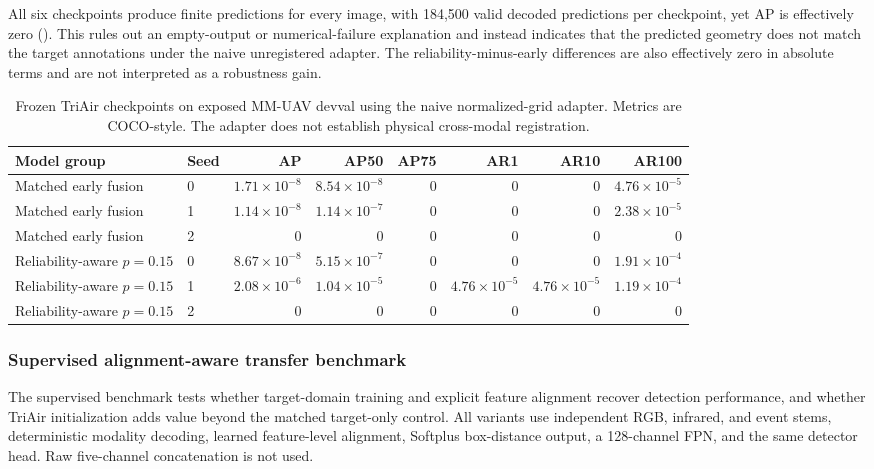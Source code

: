 All six checkpoints produce finite predictions for every image, with 184,500 valid decoded predictions per checkpoint, yet AP is effectively zero (). This rules out an empty-output or numerical-failure explanation and instead indicates that the predicted geometry does not match the target annotations under the naive unregistered adapter. The reliability-minus-early differences are also effectively zero in absolute terms and are not interpreted as a robustness gain.

\begin{table}[t]
\centering
\caption{Frozen TriAir checkpoints on exposed MM-UAV devval using the naive normalized-grid adapter. Metrics are COCO-style. The adapter does not establish physical cross-modal registration.}
\label{tab:mmuav-zero-shot}
\scriptsize
\begin{tabular}{@{}llrrrrrr@{}}
\toprule
Model group & Seed & AP & AP50 & AP75 & AR1 & AR10 & AR100\\
\midrule
Matched early fusion & 0 & $1.71{\times}10^{-8}$ & $8.54{\times}10^{-8}$ & 0 & 0 & 0 & $4.76{\times}10^{-5}$\\
Matched early fusion & 1 & $1.14{\times}10^{-8}$ & $1.14{\times}10^{-7}$ & 0 & 0 & 0 & $2.38{\times}10^{-5}$\\
Matched early fusion & 2 & 0 & 0 & 0 & 0 & 0 & 0\\
Reliability-aware $p=0.15$ & 0 & $8.67{\times}10^{-8}$ & $5.15{\times}10^{-7}$ & 0 & 0 & 0 & $1.91{\times}10^{-4}$\\
Reliability-aware $p=0.15$ & 1 & $2.08{\times}10^{-6}$ & $1.04{\times}10^{-5}$ & 0 & $4.76{\times}10^{-5}$ & $4.76{\times}10^{-5}$ & $1.19{\times}10^{-4}$\\
Reliability-aware $p=0.15$ & 2 & 0 & 0 & 0 & 0 & 0 & 0\\
\bottomrule
\end{tabular}
\end{table}

\subsubsection{Supervised alignment-aware transfer benchmark}
The supervised benchmark tests whether target-domain training and explicit feature alignment recover detection performance, and whether TriAir initialization adds value beyond the matched target-only control. All variants use independent RGB, infrared, and event stems, deterministic modality decoding, learned feature-level alignment, Softplus box-distance output, a 128-channel FPN, and the same detector head. Raw five-channel concatenation is not used.

